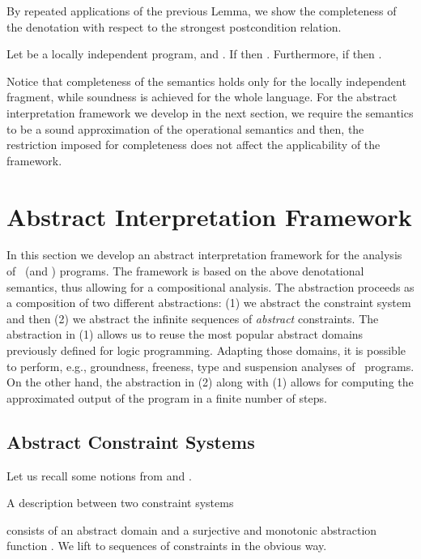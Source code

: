 \documentclass{tlp}
\begin{document}
By repeated applications of the previous Lemma, we show the completeness of the denotation with respect to the strongest postcondition relation. 
\begin{theorem}[Completeness]\label{theo:completeness}
Let   be a locally independent program,   and . If  then . 
Furthermore, if   then 
. 
\end{theorem}
Notice that completeness of the semantics holds only for the locally independent fragment, while soundness is achieved for the whole language. For the abstract interpretation framework we 
develop in the next section, we require the semantics to be a sound approximation of the operational semantics and then, the restriction imposed for completeness does not affect the applicability of the framework. 







\section{Abstract Interpretation Framework}\label{sec:absframework}
In this section we develop an abstract interpretation framework \cite{CC92} 
for the analysis of \utcc\ (and \tccp) programs. 
The framework is based on the above denotational semantics, thus allowing for a 
compositional analysis. 
The abstraction  proceeds as a composition of two different abstractions:  (1) we  abstract the constraint system and then (2) we abstract the  infinite sequences of \emph{abstract} constraints. The abstraction in (1) allows us to reuse the most popular abstract domains previously defined for logic programming. Adapting those domains, it is possible to perform, e.g., groundness, freeness, type and suspension analyses of \utcc\ programs. On the other hand, the abstraction in (2) along with (1) allows for computing the approximated output of the program in a finite number of steps. 

\subsection{Abstract Constraint Systems}
Let us recall some notions from \cite{Falaschi:97:TCS} and \cite{ZaffanellaGL97}. 


\begin{definition}[Descriptions] \label{def:description}
A description  between  two constraint systems 

  consists of an abstract domain   and a surjective and monotonic abstraction function . We lift  to sequences of constraints in the obvious way. 
\end{definition}
\end{document}

